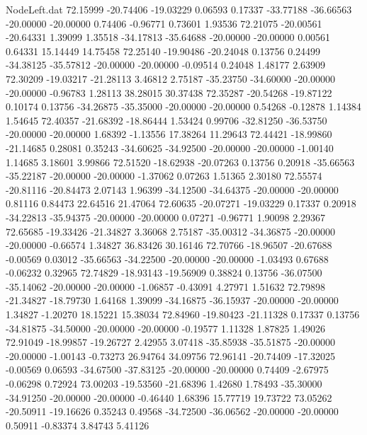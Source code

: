 \begin{filecontents}{NodeLeft.dat}
  72.15999  -20.74406  -19.03229     0.06593    0.17337  -33.77188  -36.66563  -20.00000  -20.00000    0.74406   -0.96771    0.73601    1.93536
  72.21075  -20.00561  -20.64331     1.39099    1.35518  -34.17813  -35.64688  -20.00000  -20.00000    0.00561    0.64331   15.14449   14.75458
  72.25140  -19.90486  -20.24048     0.13756    0.24499  -34.38125  -35.57812  -20.00000  -20.00000   -0.09514    0.24048    1.48177    2.63909
  72.30209  -19.03217  -21.28113     3.46812    2.75187  -35.23750  -34.60000  -20.00000  -20.00000   -0.96783    1.28113   38.28015   30.37438
  72.35287  -20.54268  -19.87122     0.10174    0.13756  -34.26875  -35.35000  -20.00000  -20.00000    0.54268   -0.12878    1.14384    1.54645
  72.40357  -21.68392  -18.86444     1.53424    0.99706  -32.81250  -36.53750  -20.00000  -20.00000    1.68392   -1.13556   17.38264   11.29643
  72.44421  -18.99860  -21.14685     0.28081    0.35243  -34.60625  -34.92500  -20.00000  -20.00000   -1.00140    1.14685    3.18601    3.99866
  72.51520  -18.62938  -20.07263     0.13756    0.20918  -35.66563  -35.22187  -20.00000  -20.00000   -1.37062    0.07263    1.51365    2.30180
  72.55574  -20.81116  -20.84473     2.07143    1.96399  -34.12500  -34.64375  -20.00000  -20.00000    0.81116    0.84473   22.64516   21.47064
  72.60635  -20.07271  -19.03229     0.17337    0.20918  -34.22813  -35.94375  -20.00000  -20.00000    0.07271   -0.96771    1.90098    2.29367
  72.65685  -19.33426  -21.34827     3.36068    2.75187  -35.00312  -34.36875  -20.00000  -20.00000   -0.66574    1.34827   36.83426   30.16146
  72.70766  -18.96507  -20.67688    -0.00569    0.03012  -35.66563  -34.22500  -20.00000  -20.00000   -1.03493    0.67688   -0.06232    0.32965
  72.74829  -18.93143  -19.56909     0.38824    0.13756  -36.07500  -35.14062  -20.00000  -20.00000   -1.06857   -0.43091    4.27971    1.51632
  72.79898  -21.34827  -18.79730     1.64168    1.39099  -34.16875  -36.15937  -20.00000  -20.00000    1.34827   -1.20270   18.15221   15.38034
  72.84960  -19.80423  -21.11328     0.17337    0.13756  -34.81875  -34.50000  -20.00000  -20.00000   -0.19577    1.11328    1.87825    1.49026
  72.91049  -18.99857  -19.26727     2.42955    3.07418  -35.85938  -35.51875  -20.00000  -20.00000   -1.00143   -0.73273   26.94764   34.09756
  72.96141  -20.74409  -17.32025    -0.00569    0.06593  -34.67500  -37.83125  -20.00000  -20.00000    0.74409   -2.67975   -0.06298    0.72924
  73.00203  -19.53560  -21.68396     1.42680    1.78493  -35.30000  -34.91250  -20.00000  -20.00000   -0.46440    1.68396   15.77719   19.73722
  73.05262  -20.50911  -19.16626     0.35243    0.49568  -34.72500  -36.06562  -20.00000  -20.00000    0.50911   -0.83374    3.84743    5.41126

\end{filecontents}
